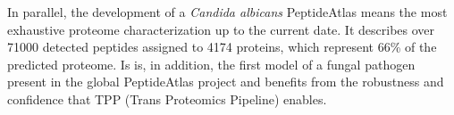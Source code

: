 In parallel, the development of a \textit{Candida albicans} PeptideAtlas
means the most exhaustive proteome characterization up to the current date.
It describes over 71000 detected peptides assigned to 4174 proteins, which
represent 66\% of the predicted proteome. Is is, in addition, the first 
model of a fungal pathogen present in the global PeptideAtlas project and
benefits from the robustness and confidence that TPP (Trans Proteomics Pipeline)
enables.

\endinput
